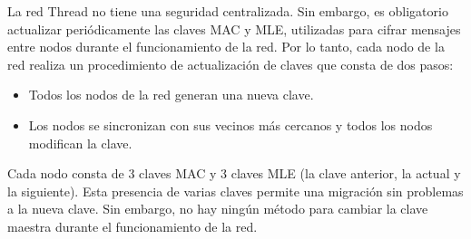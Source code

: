 \vspace{0.8cm}
La red Thread no tiene una seguridad centralizada. Sin embargo, es obligatorio actualizar periódicamente las claves MAC y MLE, utilizadas para cifrar mensajes entre nodos durante el funcionamiento de la red. Por lo tanto, cada nodo de la red realiza un procedimiento de actualización de claves que consta de dos pasos:
\begin{itemize}
\item Todos los nodos de la red generan una nueva clave.
\item Los nodos se sincronizan con sus vecinos más cercanos y todos los nodos modifican la clave.
\end{itemize}
Cada nodo consta de 3 claves MAC y 3 claves MLE (la clave anterior, la actual y la siguiente). Esta presencia de varias claves permite una migración sin problemas a la nueva clave. Sin embargo, no hay ningún método para cambiar la clave maestra durante el funcionamiento de la red.
